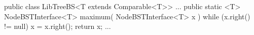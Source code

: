 public class LibTreeBS<T extends Comparable<T>> {
	...
	public static <T> NodeBSTInterface<T> maximum(
			NodeBSTInterface<T> x
		) {
		while (x.right() != null) {
			x = x.right();
		}
		return x;
	}
	...
}